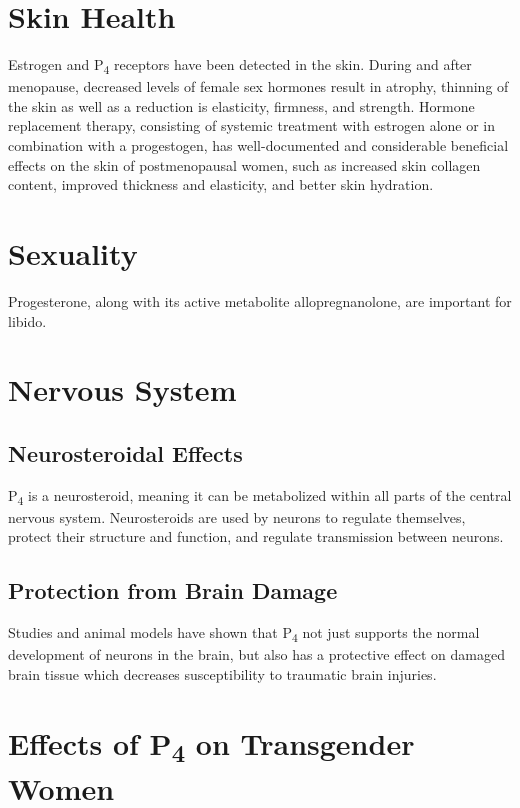 \documentclass[
	secnumdepth=3, %
]{kaohandt}
\newcommand\tsub[1]{\textsubscript{#1}}
\begin{document}
\section{Skin Health}
Estrogen and P\tsub{4} receptors have been detected in the skin. During and after menopause, decreased levels of female sex hormones result in atrophy, thinning of the skin as well as a reduction is elasticity, firmness, and strength. Hormone replacement therapy, consisting of systemic treatment with estrogen alone or in combination with a progestogen, has well-documented and considerable beneficial effects on the skin of postmenopausal women, such as increased skin collagen content, improved thickness and elasticity, and better skin hydration.

\section{Sexuality}
Progesterone, along with its active metabolite allopregnanolone, are important for libido.

\section{Nervous System}
\subsection{Neurosteroidal Effects}
P\tsub{4} is a neurosteroid, meaning it can be metabolized within all parts of the central nervous system. Neurosteroids are used by neurons to regulate themselves, protect their structure and function, and regulate transmission between neurons. 

\subsection{Protection from Brain Damage}
Studies and animal models have shown that P\tsub{4} not just supports the normal development of neurons in the brain, but also has a protective effect on damaged brain tissue which decreases susceptibility to traumatic brain injuries.

\section{Effects of P\tsub{4} on Transgender Women}
\end{document}
